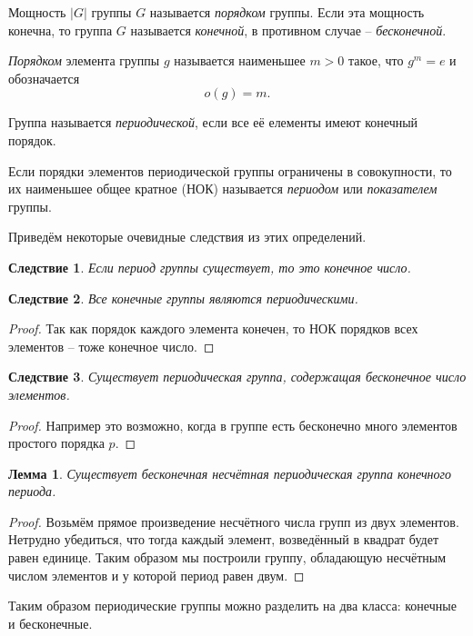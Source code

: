 \documentclass{article}
\newtheorem{corollary}{Следствие}[section]
\newtheorem{lemma}{Лемма}[section]
\begin{document}
Мощность $|G|$ группы $G$ называется \textit{порядком} группы. Если эта мощность конечна, то группа $G$ называется \textit{конечной}, в противном случае -- \textit{бесконечной}.

\textit{Порядком} элемента группы $g$ называется наименьшее $m > 0$ такое, что $g^m = e$ и обозначается $$ o(g) = m. $$

Группа называется \textit{периодической}, если все её елементы имеют конечный порядок.

Если порядки элементов периодической группы ограничены в совокупности, то их наименьшее общее кратное (НОК) называется \textit{периодом} или \textit{показателем} группы.

Приведём некоторые очевидные следствия из этих определений.

\begin{corollary}
    Если период группы существует, то это конечное число.
\end{corollary}

\begin{corollary}
    Все конечные группы являются периодическими.
\end{corollary}

\begin{proof}
    Так как порядок каждого элемента конечен, то НОК порядков всех элементов -- тоже конечное число.
\end{proof}

\begin{corollary}
    Существует периодическая группа, содержащая бесконечное число элементов.
\end{corollary}

\begin{proof}
Например это возможно, когда в группе есть бесконечно много элементов простого порядка $p$.
\end{proof}

\begin{lemma}
    Существует бесконечная несчётная периодическая группа конечного периода.
\end{lemma}
\begin{proof}
    Возьмём прямое произведение несчётного числа групп из двух элементов. Нетрудно убедиться, что тогда каждый элемент, возведённый в квадрат будет равен единице. Таким образом мы построили группу, обладающую несчётным числом элементов и у которой период равен двум. 
\end{proof}

Таким образом периодические группы можно разделить на два класса: конечные и бесконечные.
\end{document}
